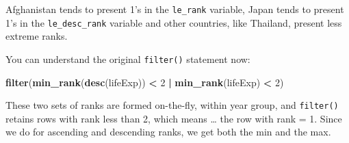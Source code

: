 \documentclass[
]{book}
\newenvironment{Shaded}{\begin{snugshade}}{\end{snugshade}}
\newcommand{\CommentTok}[1]{\textcolor[rgb]{0.56,0.35,0.01}{\textit{#1}}}
\newcommand{\DataTypeTok}[1]{\textcolor[rgb]{0.13,0.29,0.53}{#1}}
\newcommand{\DecValTok}[1]{\textcolor[rgb]{0.00,0.00,0.81}{#1}}
\newcommand{\KeywordTok}[1]{\textcolor[rgb]{0.13,0.29,0.53}{\textbf{#1}}}
\newcommand{\NormalTok}[1]{#1}
\newcommand{\OperatorTok}[1]{\textcolor[rgb]{0.81,0.36,0.00}{\textbf{#1}}}
\newcommand{\StringTok}[1]{\textcolor[rgb]{0.31,0.60,0.02}{#1}}
\begin{document}
\begin{Shaded}
\end{Shaded}

Afghanistan tends to present 1's in the \texttt{le\_rank} variable, Japan tends to present 1's in the \texttt{le\_desc\_rank} variable and other countries, like Thailand, present less extreme ranks.

You can understand the original \texttt{filter()} statement now:

\begin{Shaded}
\begin{Highlighting}[]
\KeywordTok{filter}\NormalTok{(}\KeywordTok{min_rank}\NormalTok{(}\KeywordTok{desc}\NormalTok{(lifeExp)) }\OperatorTok{<}\StringTok{ }\DecValTok{2} \OperatorTok{|}\StringTok{ }\KeywordTok{min_rank}\NormalTok{(lifeExp) }\OperatorTok{<}\StringTok{ }\DecValTok{2}\NormalTok{)}
\end{Highlighting}
\end{Shaded}

These two sets of ranks are formed on-the-fly, within year group, and \texttt{filter()} retains rows with rank less than 2, which means \ldots{} the row with rank = 1. Since we do for ascending and descending ranks, we get both the min and the max.
\end{document}
